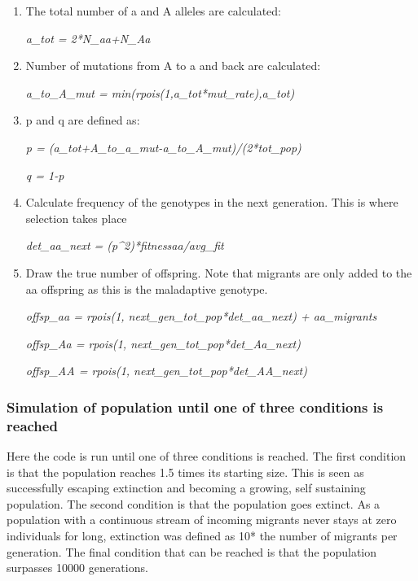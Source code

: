 \documentclass[
]{article}
\begin{document}
\begin{enumerate}
\def\labelenumi{\arabic{enumi}.}
\item
  The total number of a and A alleles are calculated:

  \emph{a\_tot = 2*N\_aa+N\_Aa}
\item
  Number of mutations from A to a and back are calculated:

  \emph{a\_to\_A\_mut = min(rpois(1,a\_tot*mut\_rate),a\_tot)}
\item
  p and q are defined as:

  \emph{p = (a\_tot+A\_to\_a\_mut-a\_to\_A\_mut)/(2*tot\_pop)}

  \emph{q = 1-p}
\item
  Calculate frequency of the genotypes in the next generation. This is
  where selection takes place

  \emph{det\_aa\_next = (p\^{}2)*fitnessaa/avg\_fit}
\item
  Draw the true number of offspring. Note that migrants are only added
  to the aa offspring as this is the maladaptive genotype.

  \emph{offsp\_aa = rpois(1, next\_gen\_tot\_pop*det\_aa\_next) +
  aa\_migrants}

  \emph{offsp\_Aa = rpois(1, next\_gen\_tot\_pop*det\_Aa\_next)}

  \emph{offsp\_AA = rpois(1, next\_gen\_tot\_pop*det\_AA\_next)}
\end{enumerate}

\hypertarget{simulation-of-population-until-one-of-three-conditions-is-reached}{%
\subsubsection{Simulation of population until one of three conditions is
reached}\label{simulation-of-population-until-one-of-three-conditions-is-reached}}

Here the code is run until one of three conditions is reached. The first
condition is that the population reaches 1.5 times its starting size.
This is seen as successfully escaping extinction and becoming a growing,
self sustaining population. The second condition is that the population
goes extinct. As a population with a continuous stream of incoming
migrants never stays at zero individuals for long, extinction was
defined as 10* the number of migrants per generation. The final
condition that can be reached is that the population surpasses 10000
generations.
\end{document}
